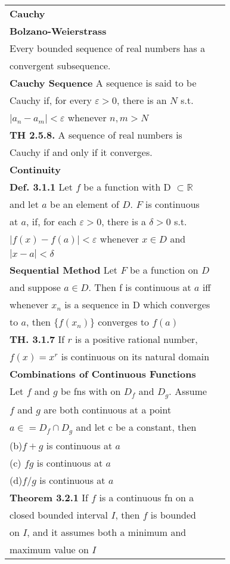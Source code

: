 \documentclass[10 pt,landscape]{article}
\begin{document}
\begin{multicols}{4}
\begin{tabular}{@{}ll@{}}


\textbf{Cauchy}\\
\textbf{Bolzano-Weierstrass}\\
Every bounded sequence of real numbers has a\\ convergent subsequence.\\
\textbf{Cauchy Sequence} A sequence is said to be \\Cauchy if, for every $\varepsilon >0$, there is an $N$ s.t. \\
$|a_n-a_m|<\varepsilon $ whenever $n,m>N$\\
\textbf{TH 2.5.8.} A sequence of real numbers is \\Cauchy if and only if it converges.\\
\textbf{Continuity}\\
\textbf{Def. 3.1.1} Let $f$ be a function with D $\subset \mathbb{R}$\\
and let $a$ be an element of $D$. $F$ is continuous\\ at $a$, if, for each $\varepsilon >0$, there is a $\delta >0$ s.t. \\ $|f(x)-f(a)|< \varepsilon $ whenever $x \in D$ and \\$|x-a|< \delta$\\
\textbf{Sequential Method} Let $F$ be a function on $D$\\
and suppose $a \in D$. Then f is continuous at $a$ iff\\ whenever $x_n$ is a sequence in D which converges\\ to $a$, then $\{f(x_n)\}$ converges to $f(a)$\\
\textbf{TH. 3.1.7} If $r$ is a positive rational number,\\ $f(x)=x^r$ is continuous on its natural domain\\
\textbf{Combinations of Continuous Functions}\\ Let $f$ and $g$ be fns with on $D_f$ and $D_g$. Assume\\ $f$ and $g$ are both continuous at a point \\ $a \in =D_f\cap D_g$ and let c be a constant, then\\
(b)$f+g$ is continuous at $a$\\
(c) $fg$ is continuous at $a$\\
(d)$f/g$ is continuous at $a$\\
\textbf{Theorem 3.2.1} If $f$ is a continuous fn on a\\ closed bounded interval $I$, then $f$ is bounded\\ on $I$, and it assumes both a minimum and\\ maximum value on $I$\\

\end{tabular}
\end{multicols}
\end{document}
